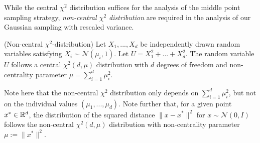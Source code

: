 While the central $\chi^2$ distribution suffices for the analysis of the middle point sampling strategy, \textit{non-central $\chi^2$ distribution} are required in the analysis of our Gaussian sampling with rescaled variance.
\begin{definition}{(Non-central $\chi^2$-distribution)}
Let $X_1,...,X_d$ be independently drawn random variables satisfying $X_i \sim \mathcal{N}(\mu_i,1)$. 
Let $U = X_1^2+...+X_d^2$. 
The random variable $U$ follows a central $\chi^2(d,\mu)$ distribution with $d$ degrees of freedom and non-centrality parameter $\mu=\sum_{i=1}^d \mu_i^2$.
\end{definition}
Note here that the non-central $\chi^2$ distribution only depends on $\sum_{i=1}^d \mu_i^2$, but not on the individual values $(\mu_1,...,\mu_d)$. 
Note further that, for a given point $x^* \in \mathbb{R}^d$, the distribution of the squared distance $\lVert x - x^*\rVert^2$ for $x \sim \mathcal{N}(0,I)$ follows the non-central $\chi^2(d,\mu)$ distribution with non-centrality parameter $\mu:=\lVert x^*\rVert^2$.

